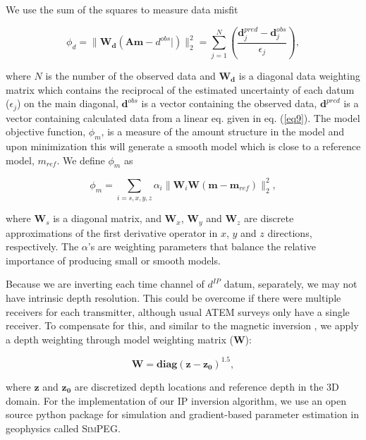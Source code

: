 \documentclass[extra,mreferee]{gji}
\newcommand{\SimPEG}{\textsc{SimPEG}\xspace}
\newcommand{\dip}{d^{IP}}
\begin{document}
We use the sum of the squares to measure data misfit
\begin{linenomath*}
\begin{equation}
  \phi_d = \| \mathbf{W_d}(\mathbf{A}\mathbf{m}-d^{obs}|)\|^2_2 =
  \sum^N_{j=1}(\frac{\mathbf{d}^{pred}_j-\mathbf{d}^{obs}_j}{\epsilon_j}),
  \label{eq11}
\end{equation}
\end{linenomath*}
where $N$ is the number of the observed data and $\mathbf{W_d}$ is a diagonal data weighting matrix which contains the reciprocal of the estimated uncertainty of each datum ($\epsilon_j$) on the main diagonal,  $\mathbf{d}^{obs}$ is a vector containing the observed data, $\mathbf{d}^{pred}$ is a vector containing calculated data from a linear eq. given in eq. (\ref{eq9}).
The model objective function, $\phi_m$, is a measure of the amount structure in the model and upon minimization this will generate a smooth model which is close to a reference model, $m_{ref}$. 
We define $\phi_m$ as
\begin{linenomath*}
\begin{equation}
  \phi_m = \sum_{i=s,x,y,z} \alpha_i\| \mathbf{W}_i\mathbf{W}(\mathbf{m}-\mathbf{m}_{ref})\|^2_2,
  \label{eq12}
\end{equation}
\end{linenomath*}
where $\mathbf{W}_s$ is a diagonal matrix, and $\mathbf{W}_x$, $\mathbf{W}_y$ and $\mathbf{W}_z$ are discrete approximations of the first derivative operator in $x$, $y$ and $z$ directions, respectively.  
The $\alpha$'s are weighting parameters that balance the relative importance of producing small or smooth models.

Because we are inverting each time channel of $\dip$ datum, separately, we may not have intrinsic depth resolution. This could be overcome if there were multiple receivers for each transmitter, although usual ATEM surveys only have a single receiver. To compensate for this, and similar to the magnetic inversion \cite[]{LiMag3D}, we apply a depth weighting through model weighting matrix ($\mathbf{W}$):
\begin{linenomath*}
\begin{equation}
    \mathbf{W} = \mathbf{diag}(\mathbf{z-z_0})^{1.5},
    \label{eq: weight_mat}
\end{equation}
\end{linenomath*}
where $\mathbf{z}$ and $\mathbf{z_0}$ are discretized depth locations and reference depth in the 3D domain.
For the implementation of our IP inversion algorithm, we use an open source python package for simulation and gradient-based parameter estimation in geophysics called \SimPEG \cite[]{Cockett2015}. 
\end{document}

